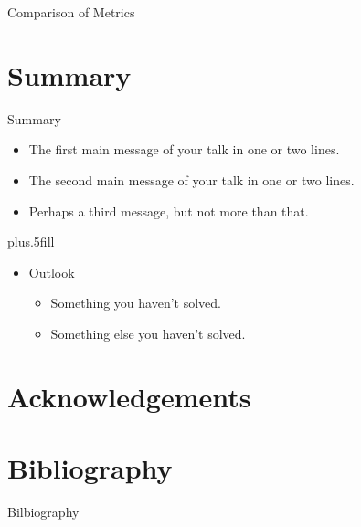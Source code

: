 \documentclass[usenames,dvipsnames]{beamer}
\begin{document}
\begin{frame}{Comparison of Metrics}
\begin{table}

\end{table}
\end{frame}

\section*{Summary}

\begin{frame}{Summary}
  \begin{itemize}
  \item
    The \alert{first main message} of your talk in one or two lines.
  \item
    The \alert{second main message} of your talk in one or two lines.
  \item
    Perhaps a \alert{third message}, but not more than that.
  \end{itemize}
  
  \vskip0pt plus.5fill
  \begin{itemize}
  \item
    Outlook
    \begin{itemize}
    \item
      Something you haven't solved.
    \item
      Something else you haven't solved.
    \end{itemize}
  \end{itemize}
\end{frame}


\appendix

\section{Acknowledgements}

\section{Bibliography}

\begin{frame}[allowframebreaks]{Bilbiography}
  
  
\end{frame}
\end{document}
